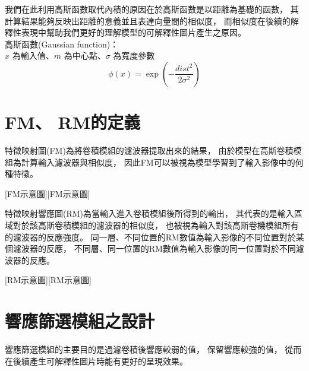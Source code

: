 \documentclass[class=NCU_thesis, crop=false]{standalone}
\begin{document}
				我們在此利用高斯函數取代內積的原因在於高斯函數是以距離為基礎的函數，
			其計算結果能夠反映出距離的意義並且表達向量間的相似度，
			而相似度在後續的解釋性表現中幫助我們更好的理解模型的可解釋性圖片產生之原因。\\
			高斯函數(Gaussian function)：\\
			  $x$ 為輸入值、$m$ 為中心點、$\sigma$ 為寬度參數
			  \begin{equation}
			      \label{eqn:rbf-gaussian-function}
			      \phi (x) = \exp \left( -\frac{dist^2}{2\sigma ^2} \right) 
			  \end{equation}

\pagebreak

\section{FM、 RM的定義}
	特徵映射圖(FM)為將卷積模組的濾波器提取出來的結果，
	由於模型在高斯卷積模組為計算輸入濾波器與相似度，
	因此FM可以被視為模型學習到了輸入影像中的何種特徵。

	[FM示意圖][FM示意圖]

	特徵映射響應圖(RM)為當輸入進入卷積模組後所得到的輸出，
	其代表的是輸入區域對於該高斯卷積模組的濾波器的相似度，
	也被視為輸入對該高斯卷機模組所有的濾波器的反應強度。
	同一層、不同位置的RM數值為輸入影像的不同位置對於某個濾波器的反應，
	不同層、同一位置的RM數值為輸入影像的同一位置對於不同濾波器的反應。

	[RM示意圖][RM示意圖]

\pagebreak

\section{響應篩選模組之設計}
	

	
	響應篩選模組的主要目的是過濾卷積後響應較弱的值，
	保留響應較強的值，
	從而在後續產生可解釋性圖片時能有更好的呈現效果。
\end{document}
